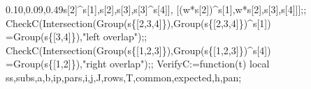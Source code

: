 \documentclass[
  10pt,
  letterpaper,
]{article}
\newenvironment{Shaded}{}{}
\newcommand{\BuiltInTok}[1]{\textcolor[rgb]{0.00,0.50,0.00}{#1}}
\newcommand{\ExtensionTok}[1]{#1}
\newcommand{\FloatTok}[1]{\textcolor[rgb]{0.25,0.63,0.44}{#1}}
\newcommand{\FunctionTok}[1]{\textcolor[rgb]{0.02,0.16,0.49}{#1}}
\newcommand{\NormalTok}[1]{#1}
\newcommand{\OperatorTok}[1]{\textcolor[rgb]{0.40,0.40,0.40}{#1}}
\newcommand{\StringTok}[1]{\textcolor[rgb]{0.25,0.44,0.63}{#1}}
\newcommand{\VariableTok}[1]{\textcolor[rgb]{0.10,0.09,0.49}{#1}}
\begin{document}
\begin{Shaded}
\begin{Highlighting}[]
\NormalTok{ [}\VariableTok{s}\NormalTok{[}\FloatTok{2}\NormalTok{]}\OperatorTok{\^{}}\VariableTok{s}\NormalTok{[}\FloatTok{1}\NormalTok{]}\OperatorTok{,}\VariableTok{s}\NormalTok{[}\FloatTok{2}\NormalTok{]}\OperatorTok{,}\VariableTok{s}\NormalTok{[}\FloatTok{3}\NormalTok{]}\OperatorTok{,}\VariableTok{s}\NormalTok{[}\FloatTok{3}\NormalTok{]}\OperatorTok{\^{}}\VariableTok{s}\NormalTok{[}\FloatTok{4}\NormalTok{]]}\OperatorTok{,}
\NormalTok{ [(}\VariableTok{w}\OperatorTok{*}\VariableTok{s}\NormalTok{[}\FloatTok{2}\NormalTok{])}\OperatorTok{\^{}}\VariableTok{s}\NormalTok{[}\FloatTok{1}\NormalTok{]}\OperatorTok{,}\VariableTok{w}\OperatorTok{*}\VariableTok{s}\NormalTok{[}\FloatTok{2}\NormalTok{]}\OperatorTok{,}\VariableTok{s}\NormalTok{[}\FloatTok{3}\NormalTok{]}\OperatorTok{,}\VariableTok{s}\NormalTok{[}\FloatTok{4}\NormalTok{]]]}\OperatorTok{;;}
\VariableTok{CheckC}\NormalTok{(}\BuiltInTok{Intersection}\NormalTok{(}\BuiltInTok{Group}\NormalTok{(}\VariableTok{s}\NormalTok{\{[}\FloatTok{2}\OperatorTok{,}\FloatTok{3}\OperatorTok{,}\FloatTok{4}\NormalTok{]\})}\OperatorTok{,}\BuiltInTok{Group}\NormalTok{(}\VariableTok{s}\NormalTok{\{[}\FloatTok{2}\OperatorTok{,}\FloatTok{3}\OperatorTok{,}\FloatTok{4}\NormalTok{]\})}\OperatorTok{\^{}}\VariableTok{s}\NormalTok{[}\FloatTok{1}\NormalTok{])}
 \OperatorTok{=}\BuiltInTok{Group}\NormalTok{(}\VariableTok{s}\NormalTok{\{[}\FloatTok{3}\OperatorTok{,}\FloatTok{4}\NormalTok{]\})}\OperatorTok{,}\StringTok{"left overlap"}\NormalTok{)}\OperatorTok{;;}
\VariableTok{CheckC}\NormalTok{(}\BuiltInTok{Intersection}\NormalTok{(}\BuiltInTok{Group}\NormalTok{(}\VariableTok{s}\NormalTok{\{[}\FloatTok{1}\OperatorTok{,}\FloatTok{2}\OperatorTok{,}\FloatTok{3}\NormalTok{]\})}\OperatorTok{,}\BuiltInTok{Group}\NormalTok{(}\VariableTok{s}\NormalTok{\{[}\FloatTok{1}\OperatorTok{,}\FloatTok{2}\OperatorTok{,}\FloatTok{3}\NormalTok{]\})}\OperatorTok{\^{}}\VariableTok{s}\NormalTok{[}\FloatTok{4}\NormalTok{])}
 \OperatorTok{=}\BuiltInTok{Group}\NormalTok{(}\VariableTok{s}\NormalTok{\{[}\FloatTok{1}\OperatorTok{,}\FloatTok{2}\NormalTok{]\})}\OperatorTok{,}\StringTok{"right overlap"}\NormalTok{)}\OperatorTok{;;}
\VariableTok{VerifyC}\OperatorTok{:=}\FunctionTok{function}\NormalTok{(}\VariableTok{t}\NormalTok{)}
 \ExtensionTok{local} \VariableTok{ss}\OperatorTok{,}\VariableTok{subs}\OperatorTok{,}\VariableTok{a}\OperatorTok{,}\VariableTok{b}\OperatorTok{,}\VariableTok{ip}\OperatorTok{,}\VariableTok{pars}\OperatorTok{,}\VariableTok{i}\OperatorTok{,}\VariableTok{j}\OperatorTok{,}\VariableTok{J}\OperatorTok{,}\VariableTok{rows}\OperatorTok{,}\VariableTok{T}\OperatorTok{,}\VariableTok{common}\OperatorTok{,}\VariableTok{expected}\OperatorTok{,}\VariableTok{h}\OperatorTok{,}\VariableTok{pan}\OperatorTok{;}

\end{Highlighting}
\end{Shaded}
\end{document}
